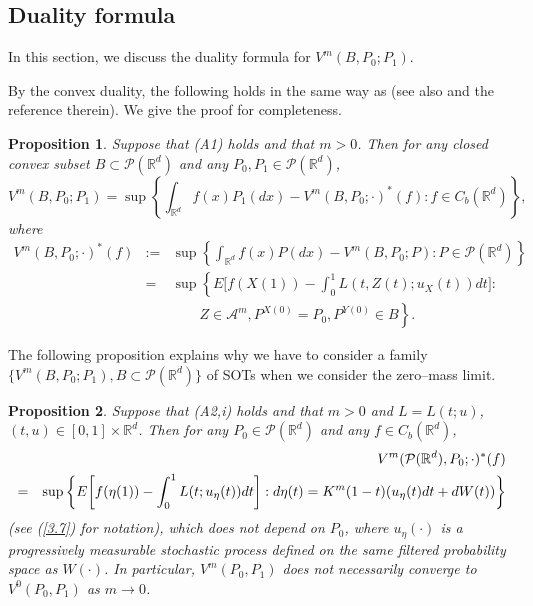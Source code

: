 \documentclass[12pt]{article}
\newtheorem{proposition}{Proposition}[section]
\begin{document}
\subsection{Duality formula}
In this section, we discuss the duality formula for $V^m(B, P_0;P_1)$.


By the convex duality, the following holds  in the same way as \cite{M21} (see also \cite{M2021,MT06} and the reference therein).
We give the proof for completeness.

\begin{proposition}\label{pp2.2}
Suppose that (A1) holds and that $m>0$.
Then  for any closed convex subset $B\subset \mathcal{P}(\mathbb{R}^d)$
and any $P_0,P_1\in \mathcal{P}(\mathbb{R}^d )$, 
\begin{equation}
V^m(B, P_0;P_1)
=\sup\left \{\int_{\mathbb{R}^d}f(x)P_1(dx)-V^m(B, P_0;\cdot)^*(f):f\in C_b (\mathbb{R}^d)\right\},
\end{equation}
where 
\begin{eqnarray*}
V^m(B, P_0;\cdot)^*(f)
&:=&\sup\left\{\int_{\mathbb{R}^d}f(x)P(dx)
-V^m(B,P_0;P):P\in  \mathcal{P}(\mathbb{R}^d)\right\}\\
&=&\sup \left\{E\biggl[f(X(1))-\int_0^1 L(t,Z(t);u_X (t))dt \biggr]:\right.\\
&&\qquad \left.Z\in \mathcal{A}^m, 
P^{X(0)}=P_0, P^{Y(0)}\in B\right\}.
\end{eqnarray*}
\end{proposition}

The following proposition explains why we have to consider a family $\{V^m(B, P_0;P_1), B\subset \mathcal{P}(\mathbb{R}^d)\}$ of SOTs when we consider the zero--mass limit.

\begin{proposition}\label{pp2.3}
Suppose that (A2,i) holds and that $m>0$ and $L=L(t;u)$, $(t,u)\in [0,1]\times \mathbb{R}^d$.
Then for any $P_0\in  \mathcal{P}(\mathbb{R}^d)$ and any $f\in  C_b (\mathbb{R}^d)$,
\begin{eqnarray}
&&V^m(\mathcal{P}(\mathbb{R}^d ), P_0;\cdot)^*(f)\label{2.34.1}\\
&=&\sup\left\{E\biggl[f(\eta (1))-\int_0^1 L(t;u_\eta (t))dt \biggr]:
d\eta (t) =K^m(1-t)(u_\eta(t)dt+dW(t))\right\}\notag
\end{eqnarray}
(see (\ref{3.7}) for notation), which does not depend on $P_0$,
where $u_\eta(\cdot)$ is a progressively measurable stochastic process defined on the same filtered probability space as $W(\cdot)$.
In particular, $V^m(P_0,P_1)$ does not necessarily converge to $V^0(P_0,P_1)$ as $m\to 0$.
\end{proposition}
\end{document}
